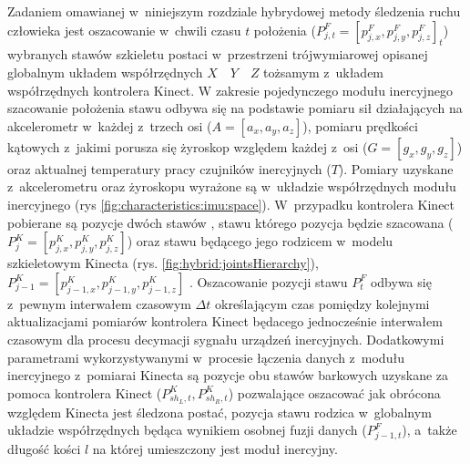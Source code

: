 Zadaniem omawianej w~niniejszym rozdziale hybrydowej metody śledzenia ruchu człowieka jest oszacowanie w~chwili czasu $t$ położenia ($P^F_{j,t} = [p^F_{j,x}, p^F_{j,y}, p^F_{j,z}]_t$)  wybranych stawów szkieletu postaci w~przestrzeni trójwymiarowej opisanej globalnym układem współrzędnych $X\quad Y\quad Z$ tożsamym z~układem współrzędnych kontrolera Kinect.
W zakresie pojedynczego modułu inercyjnego szacowanie położenia stawu odbywa się na podstawie pomiaru sił działających na akcelerometr w~każdej z~trzech osi 
($A = [a_x, a_y, a_z]$), pomiaru prędkości kątowych z~jakimi porusza się żyroskop względem każdej z~osi 
($G = [g_x, g_y, g_z]$) oraz aktualnej temperatury pracy czujników inercyjnych ($T$). Pomiary uzyskane z~akcelerometru oraz żyroskopu wyrażone są w~układzie współrzędnych modułu inercyjnego (rys \ref{fig:characteristics:imu:space}). W~przypadku kontrolera Kinect pobierane są pozycje dwóch stawów 
, stawu którego pozycja będzie szacowana ($P^K_{j} = [p^K_{j,x}, p^K_{j,y}, p^K_{j,z}]$) oraz stawu będącego jego rodzicem w~modelu szkieletowym Kinecta (rys. \ref{fig:hybrid:jointsHierarchy}), $P^K_{j-1} = [p^K_{j-1,x},p^K_{j-1,y}, p^K_{j-1,z}]$ 
. Oszacowanie pozycji stawu $P^F_t$ odbywa się z~pewnym interwałem czasowym $\Delta t$ określającym czas pomiędzy kolejnymi aktualizacjami pomiarów kontrolera Kinect będacego jednocześnie interwałem czasowym dla procesu decymacji sygnału urządzeń inercyjnych. Dodatkowymi parametrami wykorzystywanymi w~procesie łączenia danych z~modułu inercyjnego z~pomiarai Kinecta są pozycje obu stawów barkowych uzyskane za pomoca kontrolera Kinect ($P^K_{sh_L,t}, P^K_{sh_R,t}$) pozwalające oszacować jak obrócona względem Kinecta jest śledzona postać, pozycja stawu rodzica w~globalnym układzie współrzędnych będąca wynikiem osobnej fuzji danych ($P^F_{j-1,t}$), a~także długość kości $l$ na której umieszczony jest moduł inercyjny.

